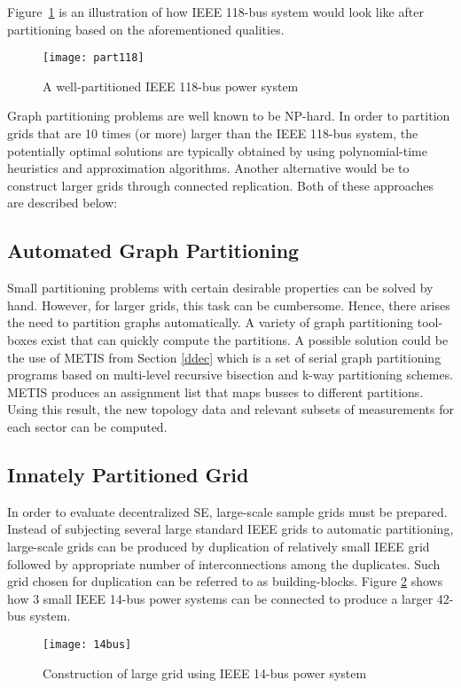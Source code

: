 \documentclass[thesis.tex]{subfiles}
\begin{document}
Figure~\ref{fig:part118} is an illustration of how IEEE 118-bus system would look like after partitioning based on the aforementioned qualities.
\begin{figure}[H]
	\centering
	\texttt{[image: part118]}
	\caption{A well-partitioned IEEE 118-bus power system}
	\label{fig:part118}
\end{figure}

Graph partitioning problems are well known to be NP-hard. In order to partition grids that are 10 times (or more) larger than the IEEE 118-bus system, the potentially optimal solutions are typically obtained by using polynomial-time heuristics and approximation algorithms. Another alternative would be to construct larger grids through connected replication. Both of these approaches are described below:

\subsection{Automated Graph Partitioning}
Small partitioning problems with certain desirable properties can be solved by hand. However, for larger grids, this task can be cumbersome. Hence, there arises the need to partition graphs automatically. A variety of graph partitioning tool-boxes exist that can quickly compute the partitions. A possible solution could be the use of METIS from Section \ref{ddec} which is a set of serial graph partitioning programs based on multi-level recursive bisection and k-way partitioning schemes. METIS produces an assignment list that maps busses to different partitions. Using this result, the new topology data and relevant subsets of measurements for each sector can be computed.

\subsection{Innately Partitioned Grid}\label{subsec:innately}
In order to evaluate decentralized SE, large-scale sample grids must be prepared. Instead of subjecting several large standard IEEE grids to automatic partitioning, large-scale grids can be produced by duplication of relatively small IEEE grid followed by appropriate number of interconnections among the duplicates. Such grid chosen for duplication can be referred to as building-blocks. Figure \ref{fig:14bus} shows how 3 small IEEE 14-bus power systems can be connected to produce a larger 42-bus system.
\begin{figure}[H]
	\centering
	\texttt{[image: 14bus]}
	\caption{Construction of large grid using IEEE 14-bus power system}
	\label{fig:14bus}
\end{figure}
\end{document}
